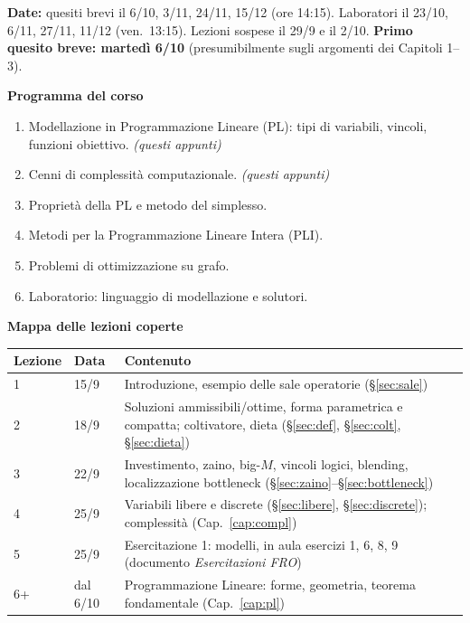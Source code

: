 \textbf{Date:} quesiti brevi il 6/10, 3/11, 24/11, 15/12 (ore 14:15). Laboratori il 23/10, 6/11, 27/11, 11/12 (ven.\ 13:15). Lezioni sospese il 29/9 e il 2/10. \textbf{Primo quesito breve: martedì 6/10} (presumibilmente sugli argomenti dei Capitoli 1--3).

\textbf{Programma del corso}
\begin{enumerate}[nosep]
  \item Modellazione in Programmazione Lineare (PL): tipi di variabili, vincoli, funzioni obiettivo. \hfill \emph{(questi appunti)}
  \item Cenni di complessità computazionale. \hfill \emph{(questi appunti)}
  \item Proprietà della PL e metodo del simplesso.
  \item Metodi per la Programmazione Lineare Intera (PLI).
  \item Problemi di ottimizzazione su grafo.
  \item Laboratorio: linguaggio di modellazione e solutori.
\end{enumerate}

\textbf{Mappa delle lezioni coperte}

\begin{tabular}{@{}llp{}@{}}
\toprule
Lezione & Data & Contenuto \\ \midrule
1 & 15/9 & Introduzione, esempio delle sale operatorie (\S\ref{sec:sale}) \\
2 & 18/9 & Soluzioni ammissibili/ottime, forma parametrica e compatta; coltivatore, dieta (\S\ref{sec:def}, \S\ref{sec:colt}, \S\ref{sec:dieta}) \\
3 & 22/9 & Investimento, zaino, big-$M$, vincoli logici, blending, localizzazione bottleneck (\S\ref{sec:zaino}--\S\ref{sec:bottleneck}) \\
4 & 25/9 & Variabili libere e discrete (\S\ref{sec:libere}, \S\ref{sec:discrete}); complessità (Cap.~\ref{cap:compl}) \\
5 & 25/9 & Esercitazione 1: modelli, in aula esercizi 1, 6, 8, 9 (documento \emph{Esercitazioni FRO}) \\
6+ & dal 6/10 & Programmazione Lineare: forme, geometria, teorema fondamentale (Cap.~\ref{cap:pl}) \\
\bottomrule
\end{tabular}
